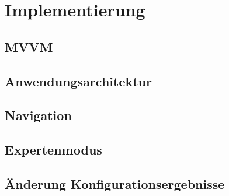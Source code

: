 \chapter{Implementierung}\label{chapter_5}

\section{MVVM}
\section{Anwendungsarchitektur}
\section{Navigation}
\section{Expertenmodus}
\section{Änderung Konfigurationsergebnisse}
